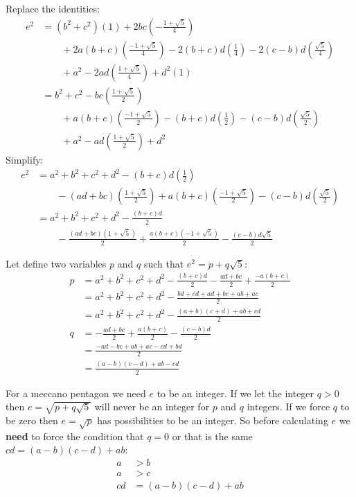 \documentclass[11pt]{article}
\begin{document}
Replace the identities:
\begin{align*}
e^2 &= (b^2+c^2)(1) + 2bc(-\frac{1 + \sqrt{5}}{4})\\
    &\qquad + 2a(b+c)(\frac{-1+\sqrt{5}}{4}) - 2(b+c)d(\frac{1}{4}) - 2(c-b)d(\frac{\sqrt{5}}{4})\\
    &\qquad + a^2 - 2ad(\frac{1+\sqrt{5}}{4}) + d^2(1)\\
    &= b^2+c^2 - bc(\frac{1 + \sqrt{5}}{2})\\
    &\qquad + a(b+c)(\frac{-1+\sqrt{5}}{2}) - (b+c)d(\frac{1}{2}) - (c-b)d(\frac{\sqrt{5}}{2})\\
    &\qquad + a^2 - ad(\frac{1+\sqrt{5}}{2}) + d^2
\end{align*}
Simplify:
\begin{align*}
e^2 &= a^2+b^2+c^2 + d^2 - (b+c)d(\frac{1}{2}) \\
    &\qquad - (ad+bc)(\frac{1 + \sqrt{5}}{2}) + a(b+c)(\frac{-1+\sqrt{5}}{2}) - (c-b)d(\frac{\sqrt{5}}{2})\\
    &= a^2+b^2+c^2 + d^2 - \frac{(b+c)d}{2} \\
    &\qquad - \frac{(ad+bc)(1 + \sqrt{5})}{2} + \frac{a(b+c)(-1+\sqrt{5})}{2} - \frac{(c-b)d\sqrt{5}}{2}
\end{align*}

Let define two variables $p$ and $q$ such that $e^2 = p + q\sqrt{5}$:
\begin{align*}
p &= a^2+b^2+c^2 + d^2 - \frac{(b+c)d}{2} - \frac{ad+bc}{2} + \frac{-a(b+c)}{2}\\
  &= a^2+b^2+c^2 + d^2 - \frac{bd +cd +ad +bc +ab + ac}{2}\\
  &= a^2+b^2+c^2 + d^2 - \frac{(a+b)(c+d)+ab+cd}{2}\\
q &= - \frac{ad+bc}{2} + \frac{a(b+c)}{2} - \frac{(c-b)d}{2}\\
  &= \frac{-ad - bc + ab + ac - cd + bd}{2}\\
  &= \frac{(a-b)(c-d) + ab - cd}{2}
\end{align*}

For a meccano pentagon we need $e$ to be an integer. If we let the integer $q > 0$ then $e = \sqrt{p + q\sqrt{5}}$ will never be an integer for $p$ and $q$ integers. If we force $q$ to be zero then $e = \sqrt{p}$ has possibilities to be an integer.
So before calculating $e$ we \textbf{need} to force the condition that $q = 0$ or that is the same $cd = (a-b)(c-d)+ab$:
\begin{align*}
a  & > b\\
a  & > c\\
cd &= (a-b)(c-d)+ab\\
\end{align*}
\end{document}
